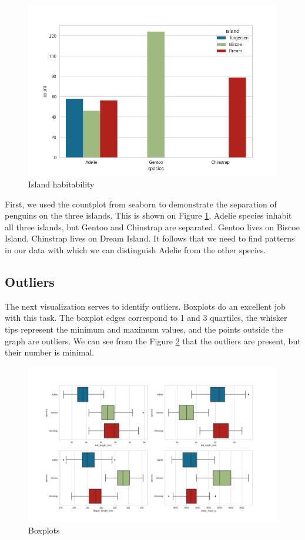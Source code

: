 \documentclass[12pt,a4paper]{article}
\begin{document}
\begin{figure}[h]
	\centering
	\includegraphics[width=0.8\linewidth]{fig_island_habitability}
	\caption{Island habitability}
	\label{fig:fig_island_habitability}
\end{figure}

First, we used the countplot from seaborn to demonstrate the separation of penguins on the three islands.
This is shown on Figure \ref{fig:fig_island_habitability},
Adelie species inhabit all three islands, but Gentoo and Chinstrap are separated.
Gentoo lives on Biscoe Island.
Chinstrap lives on Dream Island.
It follows that we need to find patterns in our data with which we can distinguish Adelie from the other species.

\subsection{Outliers}

The next visualization serves to identify outliers. Boxplots do an excellent job with this task. The boxplot edges correspond to 1 and 3 quartiles, the whisker tips represent the minimum and maximum values, and the points outside the graph are outliers. We can see from the Figure \ref{fig:boxplots} that the outliers are present, but their number is minimal.

\begin{figure}[h]
	\centering
	\includegraphics[width=1.0\linewidth]{fig_boxplots}
	\caption{Boxplots}
	\label{fig:boxplots}
\end{figure}
\end{document}
